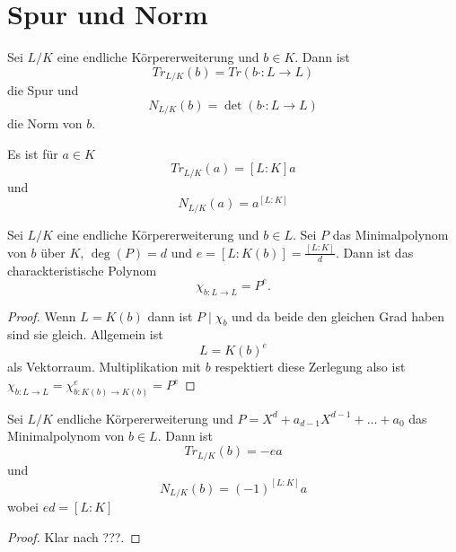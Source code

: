 \section{Spur und Norm}
\begin{Def}
	Sei \(L/K\) eine endliche Körpererweiterung und \(b\in K\).
	Dann ist \[Tr_{L/K}(b)=Tr(b\cdot \colon L\to L)\] die Spur und
	\[N_{L/K}(b)=\det(b\cdot\colon L\to L)\] die Norm von \(b\).
\end{Def}
\begin{Bem}
	Es ist für \(a\in K\)
	\[Tr_{L/K}(a)=[L:K]a\] und
	\[N_{L/K}(a)=a^{[L:K]}\]
\end{Bem}
\begin{Lemma}
	Sei \(L/K\) eine endliche Körpererweiterung und \(b\in L\). Sei \(P\) das Minimalpolynom von \(b\) über \(K\),
	\(\deg(P)=d\) und \(e=[L:K(b)]=\frac{[L:K]}{d}\). Dann ist das charackteristische Polynom \[\chi_{b\colon L\to L}=P^e.\]
\end{Lemma}
\begin{proof}
	Wenn \(L=K(b)\) dann ist \(P\mid \chi_b\) und da beide den gleichen Grad haben sind sie gleich.
	Allgemein ist \[L=K(b)^e\] als Vektorraum. Multiplikation mit \(b\) respektiert diese Zerlegung also ist
	\(\chi_{b\colon L\to L}=\chi_{b\colon K(b)\to K(b)}^e=P^e\)
\end{proof}
\begin{Kor}
	Sei \(L/K\) endliche Körpererweiterung und \(P=X^d+a_{d-1}X^{d-1}+\dots+a_0\) das Minimalpolynom von \(b\in L\). Dann ist 
	\[Tr_{L/K}(b)=-ea\] und
	\[N_{L/K}(b)=(-1)^{[L:K]}a\] wobei \(ed=[L:K]\)
\end{Kor}
\begin{proof} Klar nach ???.
\end{proof}
